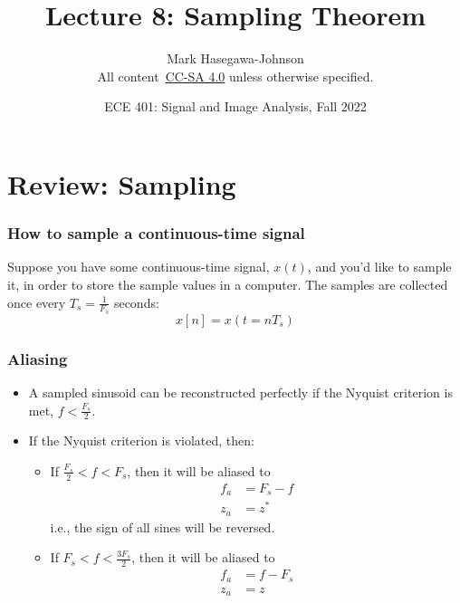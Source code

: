 \documentclass{beamer}
\title{Lecture 8: Sampling Theorem}
\author{Mark Hasegawa-Johnson\\All content~\href{https://creativecommons.org/licenses/by-sa/4.0/}{CC-SA 4.0} unless otherwise specified.}
\date{ECE 401: Signal and Image Analysis, Fall 2022}
\begin{document}
\begin{frame}
  \maketitle
\end{frame}

\begin{frame}
  \tableofcontents
\end{frame}

\section[Sampling]{Review: Sampling}
\setcounter{subsection}{1}

\begin{frame}
  \frametitle{How to sample a continuous-time signal}

  Suppose you have some continuous-time signal, $x(t)$, and you'd like
  to sample it, in order to store the sample values in a computer.
  The samples are collected once every $T_s=\frac{1}{F_s}$ seconds:
  \begin{displaymath}
    x[n] = x(t=nT_s)
  \end{displaymath}
\end{frame}

\begin{frame}
  \frametitle{Aliasing}

  \begin{itemize}
  \item A sampled sinusoid can be reconstructed perfectly if the
    Nyquist criterion is met, $f < \frac{F_s}{2}$.
  \item If the Nyquist criterion is violated, then:
    \begin{itemize}
    \item If $\frac{F_s}{2}<f<F_s$, then it will be aliased to
      \begin{align*}
        f_a &= F_s-f\\
        z_a &= z^*
      \end{align*}
      i.e., the sign of all sines will be reversed.
    \item If $F_s < f < \frac{3F_s}{2}$, then it will be aliased to
      \begin{align*}
        f_a &= f-F_s\\
        z_a &= z
      \end{align*}
    \end{itemize}
  \end{itemize}
\end{frame}
\end{document}
